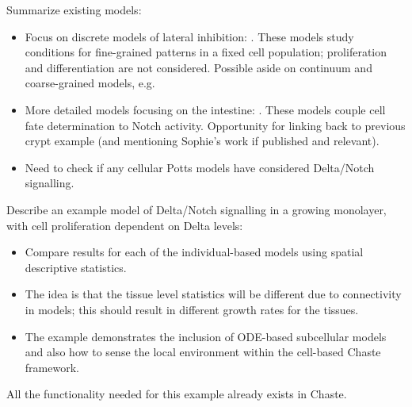 \documentclass{article}
\begin{document}
\noindent Summarize existing models:
\begin{itemize}
\item Focus on discrete models of lateral inhibition: \citet{Collier1996Pattern, Owen1998Mathematical, Wearing2001Nonlinear, Webb2004Oscillations}. These models study conditions for fine-grained patterns in a fixed cell population; proliferation and differentiation are not considered. Possible aside on continuum and coarse-grained models, e.g. \citet{ODea2011Continuum}
\item More detailed models focusing on the intestine: \citet{Buske2011Comprehensive, Pin2012Modelling}. These models couple cell fate determination to Notch activity. Opportunity for linking back to previous crypt example (and mentioning Sophie's work if published and relevant).
\item Need to check if any cellular Potts models have considered Delta/Notch signalling.
\end{itemize}

\noindent Describe an example model of Delta/Notch signalling in a growing monolayer, with cell proliferation dependent on Delta levels:
\begin{itemize}
\item Compare results for each of the individual-based models using spatial descriptive statistics.
\item The idea is that the tissue level statistics will be different due to connectivity in models; this should result in different growth rates for the tissues.
\item The example demonstrates the inclusion of ODE-based subcellular models and also how to sense the local environment within the cell-based Chaste framework.
\end{itemize}

\noindent All the functionality needed for this example already exists in Chaste.
\end{document}
